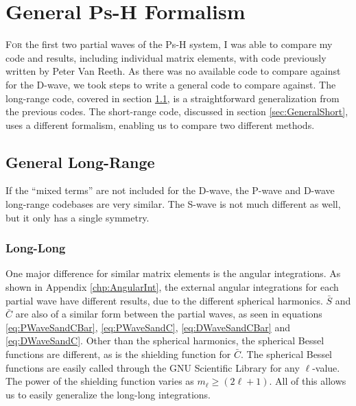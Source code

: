 \documentclass[Dissertation.tex]{subfiles}
\begin{document}
\clearpage
\pagebreak
\newpage

\chapter{General Ps-H Formalism}
\label{chp:General}


\lettrine{\textcolor{startcolor}{F}}{or} the first two partial waves of the Ps-H system, I was able to compare my code and results, including individual matrix elements, with code previously written by Peter Van Reeth. As there was no available code to compare against for the D-wave, we took steps to write a general code to compare against. The long-range code, covered in section \ref{sec:GeneralLong}, is a straightforward generalization from the previous codes. The short-range code, discussed in section \ref{sec:GeneralShort}, uses a different formalism, enabling us to compare two different methods.

\section{General Long-Range}
\label{sec:GeneralLong}

If the ``mixed terms'' are not included for the D-wave, the P-wave and D-wave long-range codebases are very similar. The S-wave is not much different as well, but it only has a single symmetry.

\subsection{Long-Long}
\label{sec:GeneralLongLong}
One major difference for similar matrix elements is the angular integrations. As shown in Appendix \ref{chp:AngularInt}, the external angular integrations for each partial wave have different results, due to the different spherical harmonics. $\bar{S}$ and $\bar{C}$ are also of a similar form between the partial waves, as seen in equations \ref{eq:PWaveSandCBar}, \ref{eq:PWaveSandC}, \ref{eq:DWaveSandCBar} and \ref{eq:DWaveSandC}. Other than the spherical harmonics, the spherical Bessel functions are different, as is the shielding function for $\bar{C}$. The spherical Bessel functions are easily called through the GNU Scientific Library \cite{GSL} for any $\ell$-value. The power of the shielding function varies as $m_\ell \geq (2\ell + 1)$. All of this allows us to easily generalize the long-long integrations.
\end{document}
